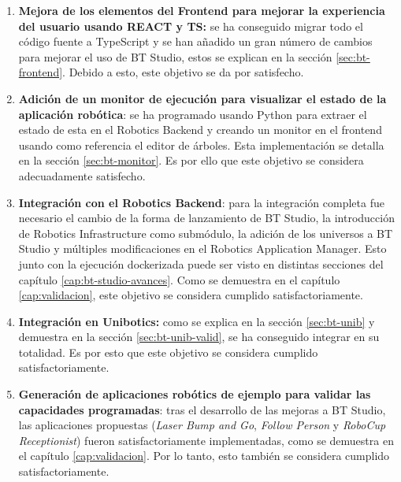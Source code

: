 \begin{enumerate}

    \item \textbf{Mejora de los elementos del Frontend para mejorar la experiencia del usuario usando REACT y TS:} se ha conseguido migrar todo el código fuente a TypeScript y se han añadido un gran número de cambios para mejorar el uso de BT Studio, estos se explican en la sección \ref{sec:bt-frontend}. Debido a esto, este objetivo se da por satisfecho. 
  
    \item \textbf{Adición de un monitor de ejecución para visualizar el estado de la aplicación robótica}: 
    se ha programado usando Python para extraer el estado de esta en el Robotics Backend y creando un monitor en el frontend usando como referencia el editor de árboles. Esta implementación se detalla en la sección \ref{sec:bt-monitor}. Es por ello que este objetivo se considera adecuadamente satisfecho. 
  
    \item \textbf{Integración con el Robotics Backend}: para la integración completa fue necesario el cambio de la forma de lanzamiento de BT Studio, la introducción de Robotics Infrastructure como submódulo, la adición de los universos a BT Studio y múltiples modificaciones en el Robotics Application Manager. Esto junto con la ejecución dockerizada puede ser visto en distintas secciones del capítulo \ref{cap:bt-studio-avances}. Como se demuestra en el capítulo \ref{cap:validacion}, este objetivo se considera cumplido satisfactoriamente. 
  
    \item \textbf{Integración en Unibotics:} como se explica en la sección \ref{sec:bt-unib} y demuestra en la sección \ref{sec:bt-unib-valid}, se ha conseguido integrar en su totalidad. Es por esto que este objetivo se considera cumplido satisfactoriamente. 
    
    \item \textbf{Generación de aplicaciones robótics de ejemplo para validar las capacidades programadas}: tras el desarrollo de las mejoras a BT Studio, las aplicaciones propuestas (\textit{Laser Bump and Go}, \textit{Follow Person} y \textit{RoboCup Receptionist}) fueron satisfactoriamente implementadas, como se demuestra en el capítulo \ref{cap:validacion}. Por lo tanto, esto también se considera cumplido satisfactoriamente. 

\end{enumerate}

